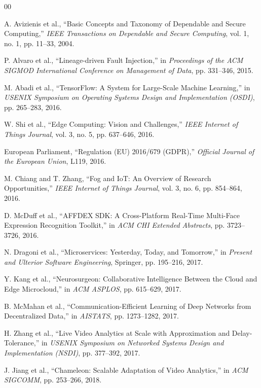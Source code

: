 \documentclass[conference]{IEEEtran}
\begin{document}
\begin{thebibliography}{00}

 A. Avizienis et al., ``Basic Concepts and Taxonomy of Dependable and Secure Computing,'' \textit{IEEE Transactions on Dependable and Secure Computing}, vol. 1, no. 1, pp. 11--33, 2004.

 P. Alvaro et al., ``Lineage-driven Fault Injection,'' in \textit{Proceedings of the ACM SIGMOD International Conference on Management of Data}, pp. 331--346, 2015.

 M. Abadi et al., ``TensorFlow: A System for Large-Scale Machine Learning,'' in \textit{USENIX Symposium on Operating Systems Design and Implementation (OSDI)}, pp. 265--283, 2016.

 W. Shi et al., ``Edge Computing: Vision and Challenges,'' \textit{IEEE Internet of Things Journal}, vol. 3, no. 5, pp. 637--646, 2016.

 European Parliament, ``Regulation (EU) 2016/679 (GDPR),'' \textit{Official Journal of the European Union}, L119, 2016.

 M. Chiang and T. Zhang, ``Fog and IoT: An Overview of Research Opportunities,'' \textit{IEEE Internet of Things Journal}, vol. 3, no. 6, pp. 854--864, 2016.

 D. McDuff et al., ``AFFDEX SDK: A Cross-Platform Real-Time Multi-Face Expression Recognition Toolkit,'' in \textit{ACM CHI Extended Abstracts}, pp. 3723--3726, 2016.

 N. Dragoni et al., ``Microservices: Yesterday, Today, and Tomorrow,'' in \textit{Present and Ulterior Software Engineering}, Springer, pp. 195--216, 2017.

 Y. Kang et al., ``Neurosurgeon: Collaborative Intelligence Between the Cloud and Edge Microcloud,'' in \textit{ACM ASPLOS}, pp. 615--629, 2017.

 B. McMahan et al., ``Communication-Efficient Learning of Deep Networks from Decentralized Data,'' in \textit{AISTATS}, pp. 1273--1282, 2017.

 H. Zhang et al., ``Live Video Analytics at Scale with Approximation and Delay-Tolerance,'' in \textit{USENIX Symposium on Networked Systems Design and Implementation (NSDI)}, pp. 377--392, 2017.

 J. Jiang et al., ``Chameleon: Scalable Adaptation of Video Analytics,'' in \textit{ACM SIGCOMM}, pp. 253--266, 2018.


\end{thebibliography}
\end{document}
